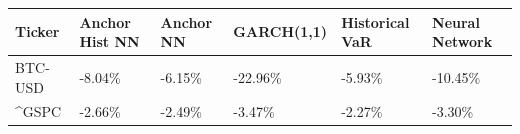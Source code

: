 \begin{tabular}{llllll}
\toprule
Ticker & Anchor Hist NN & Anchor NN & GARCH(1,1) & Historical VaR & Neural Network \\
\midrule
BTC-USD & -8.04\% & -6.15\% & -22.96\% & -5.93\% & -10.45\% \\
\^{}GSPC & -2.66\% & -2.49\% & -3.47\% & -2.27\% & -3.30\% \\
\bottomrule
\end{tabular}

